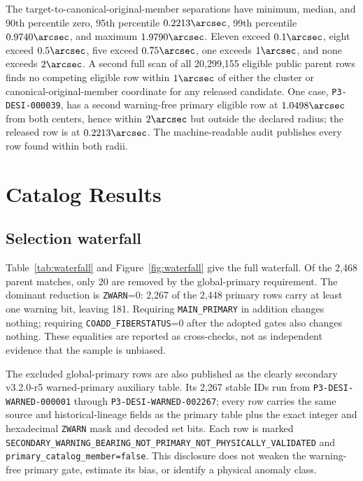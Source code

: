 \documentclass[twocolumn]{aastex701}
\newcommand{\warnedAuxVersion}{v3.2.0-r5}
\begin{document}
The target-to-canonical-original-member separations have minimum, median, and 90th percentile
zero, 95th percentile $0.2213\arcsec$, 99th percentile $0.9740\arcsec$, and maximum
$1.9790\arcsec$.  Eleven exceed $0.1\arcsec$, eight exceed $0.5\arcsec$, five exceed
$0.75\arcsec$, one exceeds $1\arcsec$, and none exceeds $2\arcsec$.  A second full scan of all
20,299,155 eligible public parent rows finds no competing eligible row within $1\arcsec$ of either
the cluster or canonical-original-member coordinate for any released candidate.  One case,
\texttt{P3-DESI-000039}, has a second warning-free primary eligible row at $1.0498\arcsec$ from
both centers, hence within $2\arcsec$ but outside the declared radius; the released row is at
$0.2213\arcsec$.  The machine-readable audit publishes every row found within both radii.

\section{Catalog Results}\label{sec:results}

\subsection{Selection waterfall}\label{sec:waterfall}

Table~\ref{tab:waterfall} and Figure~\ref{fig:waterfall} give the full waterfall.  Of the 2,468
parent matches, only 20 are removed by the global-primary requirement.  The dominant reduction
is \texttt{ZWARN}=0: 2,267 of the 2,448 primary rows carry at least one warning bit, leaving 181.
Requiring \texttt{MAIN\_PRIMARY} in addition changes nothing; requiring
\texttt{COADD\_FIBERSTATUS}=0 after the adopted gates also changes nothing.  These equalities are
reported as cross-checks, not as independent evidence that the sample is unbiased.

The excluded global-primary rows are also published as the clearly secondary
\warnedAuxVersion{} warned-primary auxiliary table.  Its 2,267 stable IDs run from
\texttt{P3-DESI-WARNED-000001} through \texttt{P3-DESI-WARNED-002267}; every row carries the
same source and historical-lineage fields as the primary table plus the exact integer and
hexadecimal \texttt{ZWARN} mask and decoded set bits.  Each row is marked
\nolinkurl{SECONDARY_WARNING_BEARING_NOT_PRIMARY_NOT_PHYSICALLY_VALIDATED} and
\texttt{primary\_catalog\_member=false}.  This disclosure does not weaken the warning-free
primary gate, estimate its bias, or identify a physical anomaly class.
\end{document}
